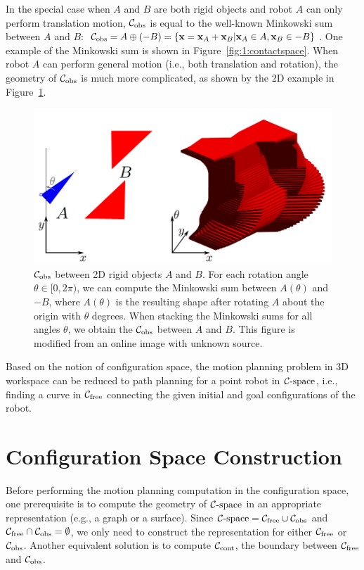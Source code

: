 In the special case when $A$ and $B$ are both rigid objects and robot $A$ can only perform translation motion, $\Cobs$ is equal to the well-known Minkowski sum between $A$ and $B$: $\mathcal C_{\text{obs}} = A \oplus (-B) = \{\mathbf x = \mathbf x_A + \mathbf x_B | \mathbf x_A \in A, \mathbf x_B \in -B \}$. One example of the Minkowski sum is shown in Figure~\ref{fig:1:contactspace}. When robot $A$ can perform general motion (i.e., both translation and rotation), the geometry of $\Cobs$ is much more complicated, as shown by the 2D example in Figure~\ref{fig:1:cspaceSE2}.

\begin{figure}[!htb]
  \centering
  \includegraphics[width=0.9\linewidth]{figs/1/cspaceSE2.png}
  \caption[$\Cobs$ between 2D rigid objects $A$ and $B$]{$\Cobs$ between 2D rigid objects $A$ and $B$. For each rotation angle $\theta \in [0, 2\pi)$, we can compute the Minkowski sum between $A(\theta)$ and $-B$, where $A(\theta)$ is the resulting shape after rotating $A$ about the origin with $\theta$ degrees. When stacking the Minkowski sums for all angles $\theta$, we obtain the $\Cobs$ between $A$ and $B$. This figure is modified from an online image with unknown source.}
  \label{fig:1:cspaceSE2}
\end{figure}

Based on the notion of configuration space, the motion planning problem in 3D workspace can be reduced to path planning for a point robot in $\mathcal C\text{-space}$, i.e., finding a curve in $\mathcal C_{\text{free}}$ connecting the given initial and goal configurations of the robot.

\section{Configuration Space Construction}
\label{sec:1:configconstruction}
Before performing the motion planning computation in the configuration space, one prerequisite is to compute the geometry of $\mathcal C\text{-space}$ in an appropriate representation (e.g., a graph or a surface). Since $\mathcal C\text{-space} = \mathcal C_{\text{free}} \cup \mathcal C_{\text{obs}}$ and $\mathcal C_{\text{free}} \cap \mathcal C_{\text{obs}} = \emptyset$, we only need to construct the representation for either $\mathcal C_{\text{free}}$ or $\Cobs$. Another equivalent solution is to compute $\mathcal C_\text{cont}$, the boundary between $\mathcal C_{\text{free}}$ and $\Cobs$.


